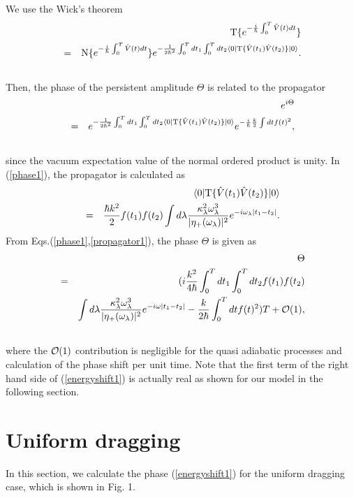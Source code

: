 \documentclass[aps,pre,twocolumn,eqsecnum,showpacs,superscriptaddress]{revtex4}
\begin{document}
We use the Wick's theorem\cite{Zuber1}
\begin{eqnarray}
&&{\rm T}\{e^{-\frac{i}{\hbar}\int_0^T \hat{V}(t)dt}\} \nonumber \\
&=&{\rm N}\{e^{-\frac{i}{\hbar}\int_0^T \hat{V}(t)dt}\}e^{-\frac{1}{2\hbar^2}\int_0^T dt_1\int_0^T dt_2\langle 0|{\rm T}\{\hat{V}(t_1)\hat{V}(t_2)\}|0\rangle}. \nonumber \\
&& \label{Wick1}
\end{eqnarray}
Then, the phase of the persistent amplitude $\Theta$ is related to the propagator 
\begin{eqnarray}
&&e^{i \Theta} \nonumber \\
&=&e^{-\frac{1}{2\hbar^2}\int_0^T dt_1\int_0^T dt_2\langle 0|{\rm T}\{\hat{V}(t_1)\hat{V}(t_2)\}|0\rangle}e^{-\frac{i}{\hbar}\frac{k}{2}\int dt f(t)^2},  \nonumber \\
&&\label{phase1}
\end{eqnarray}
since the vacuum expectation value of the normal ordered product is unity. 
In (\ref{phase1}), the propagator is calculated as
\begin{eqnarray}
&&\langle 0|{\rm T}\{\hat{V}(t_1)\hat{V}(t_2)\}|0\rangle \nonumber \\
&=&\frac{\hbar k^2}{2}f(t_1)f(t_2)\int d\lambda\frac{\kappa_\lambda^2\omega_\lambda^3}{|\eta_+(\omega_\lambda)|^2} e^{-i\omega_\lambda|t_1-t_2|}. \label{propagator1}
\end{eqnarray}
From Eqs.(\ref{phase1},\ref{propagator1}), the phase $\Theta$ is given as
\begin{eqnarray}
&&\Theta \nonumber \\
&=&(i\frac{k^2}{4\hbar}\int_0^T dt_1\int_0^T dt_2 f(t_1)f(t_2) \nonumber \\
&&\int d\lambda\frac{\kappa_\lambda^2\omega_\lambda^3}{|\eta_+(\omega_\lambda)|^2}e^{-i\omega|t_1-t_2|}-\frac{k}{2\hbar}\int_0^T dt f(t)^2)T+{\cal O}(1), \nonumber \\
&&\label{energyshift1}
\end{eqnarray}
where the ${\cal O}(1)$ contribution is negligible for the quasi adiabatic processes and calculation of the phase shift per unit time. 
Note that the first term of the right hand side of (\ref{energyshift1}) is actually real as shown for our model in the following section. 
\section{Uniform dragging}
In this section, we calculate the phase (\ref{energyshift1}) for the uniform dragging case, which is shown in Fig. 1. %
 
\end{document}
